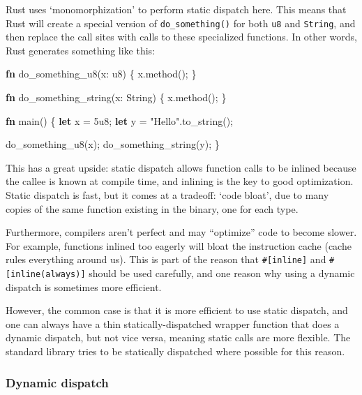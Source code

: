 \documentclass[a4paper,]{book}
\newenvironment{Shaded}{\begin{snugshade}}{\end{snugshade}}
\newcommand{\KeywordTok}[1]{\textcolor[rgb]{0.13,0.29,0.53}{\textbf{{#1}}}}
\newcommand{\DataTypeTok}[1]{\textcolor[rgb]{0.13,0.29,0.53}{{#1}}}
\newcommand{\DecValTok}[1]{\textcolor[rgb]{0.00,0.00,0.81}{{#1}}}
\newcommand{\StringTok}[1]{\textcolor[rgb]{0.31,0.60,0.02}{{#1}}}
\newcommand{\NormalTok}[1]{{#1}}
\begin{document}
Rust uses `monomorphization' to perform static dispatch here. This means
that Rust will create a special version of \texttt{do\_something()} for
both \texttt{u8} and \texttt{String}, and then replace the call sites
with calls to these specialized functions. In other words, Rust
generates something like this:

\begin{Shaded}
\begin{Highlighting}[]
\KeywordTok{fn} \NormalTok{do_something_u8(x: }\DataTypeTok{u8}\NormalTok{) \{}
    \NormalTok{x.method();}
\NormalTok{\}}

\KeywordTok{fn} \NormalTok{do_something_string(x: }\DataTypeTok{String}\NormalTok{) \{}
    \NormalTok{x.method();}
\NormalTok{\}}

\KeywordTok{fn} \NormalTok{main() \{}
    \KeywordTok{let} \NormalTok{x = }\DecValTok{5u8}\NormalTok{;}
    \KeywordTok{let} \NormalTok{y = }\StringTok{"Hello"}\NormalTok{.to_string();}

    \NormalTok{do_something_u8(x);}
    \NormalTok{do_something_string(y);}
\NormalTok{\}}
\end{Highlighting}
\end{Shaded}

This has a great upside: static dispatch allows function calls to be
inlined because the callee is known at compile time, and inlining is the
key to good optimization. Static dispatch is fast, but it comes at a
tradeoff: `code bloat', due to many copies of the same function existing
in the binary, one for each type.

Furthermore, compilers aren't perfect and may ``optimize'' code to
become slower. For example, functions inlined too eagerly will bloat the
instruction cache (cache rules everything around us). This is part of
the reason that \texttt{\#{[}inline{]}} and
\texttt{\#{[}inline(always){]}} should be used carefully, and one reason
why using a dynamic dispatch is sometimes more efficient.

However, the common case is that it is more efficient to use static
dispatch, and one can always have a thin statically-dispatched wrapper
function that does a dynamic dispatch, but not vice versa, meaning
static calls are more flexible. The standard library tries to be
statically dispatched where possible for this reason.

\subsubsection{Dynamic dispatch}\label{dynamic-dispatch}
\end{document}
